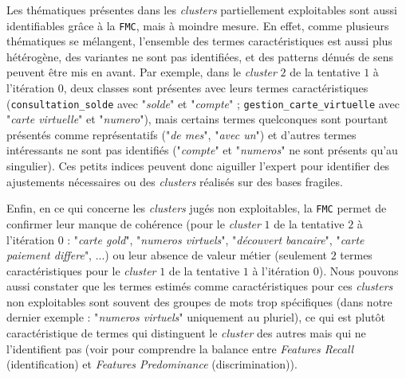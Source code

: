 			Les thématiques présentes dans les \textit{clusters} partiellement exploitables sont aussi identifiables grâce à la \texttt{FMC}, mais à moindre mesure.
			En effet, comme plusieurs thématiques se mélangent, l'ensemble des termes caractéristiques est aussi plus hétérogène, des variantes ne sont pas identifiées, et des patterns dénués de sens peuvent être mis en avant.
			Par exemple, dans le \textit{cluster} $2$ de la tentative $1$ à l'itération $0$, deux classes sont présentes avec leurs termes caractéristiques (\texttt{consultation\_solde} avec "\textit{solde}" et "\textit{compte}" ; \texttt{gestion\_carte\_virtuelle} avec "\textit{carte virtuelle}" et "\textit{numero}"), mais certains termes quelconques sont pourtant présentés comme représentatifs ("\textit{de mes}", "\textit{avec un}") et d'autres termes intéressants ne sont pas identifiés ("\textit{compte}" et "\textit{numeros}" ne sont présents qu'au singulier).
			Ces petits indices peuvent donc aiguiller l'expert pour identifier des ajustements nécessaires ou des \textit{clusters} réalisés sur des bases fragiles.
			
			Enfin, en ce qui concerne les \textit{clusters} jugés non exploitables, la \texttt{FMC} permet de confirmer leur manque de cohérence (pour le \textit{cluster} $1$ de la tentative $2$ à l'itération $0$ : "\textit{carte gold}", "\textit{numeros virtuels}", "\textit{découvert bancaire}", "\textit{carte paiement differe}", ...) ou leur absence de valeur métier (seulement $2$ termes caractéristiques pour le \textit{cluster} $1$ de la tentative $1$ à l'itération $0$).
			Nous pouvons aussi constater que les termes estimés comme caractéristiques pour ces \textit{clusters} non exploitables sont souvent des groupes de mots trop spécifiques (dans notre dernier exemple : "\textit{numeros virtuels}" uniquement au pluriel), ce qui est plutôt caractéristique de termes qui distinguent le \textit{cluster} des autres mais qui ne l'identifient pas (voir \cite{lamirel-etal:2017:novel-approach-feature} pour comprendre la balance entre \textit{Features Recall} (identification) et \textit{Features Predominance} (discrimination)).
			\\
			
